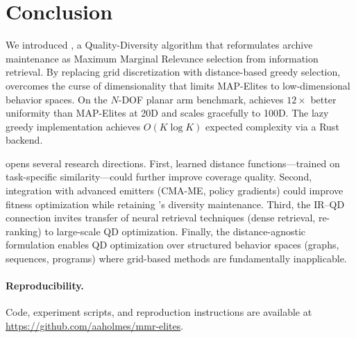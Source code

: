 \section{Conclusion}
\label{sec:conclusion}

We introduced \mmr, a Quality-Diversity algorithm that reformulates archive maintenance as Maximum Marginal Relevance selection from information retrieval.
By replacing grid discretization with distance-based greedy selection, \mmr overcomes the curse of dimensionality that limits MAP-Elites to low-dimensional behavior spaces.
On the $N$-DOF planar arm benchmark, \mmr achieves $12\times$ better uniformity than MAP-Elites at 20D and scales gracefully to 100D.
The lazy greedy implementation achieves $O(K \log K)$ expected complexity via a Rust backend.

\mmr opens several research directions.
First, learned distance functions---trained on task-specific similarity---could further improve coverage quality.
Second, integration with advanced emitters (CMA-ME, policy gradients) could improve fitness optimization while retaining \mmr's diversity maintenance.
Third, the IR--QD connection invites transfer of neural retrieval techniques (dense retrieval, re-ranking) to large-scale QD optimization.
Finally, the distance-agnostic formulation enables QD optimization over structured behavior spaces (graphs, sequences, programs) where grid-based methods are fundamentally inapplicable.

\paragraph{Reproducibility.}
Code, experiment scripts, and reproduction instructions are available at \url{https://github.com/aaholmes/mmr-elites}.
